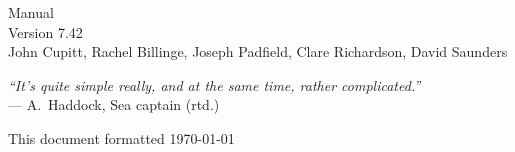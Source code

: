 \documentclass[a4paper,twocolumn,dvips]{book}
\begin{document}

\begin{titlepage}
\thispagestyle{empty}
\begin{center}
\huge
\nip{} Manual\\[0.2em]
\large Version 7.42\\
\vspace{0.5in}
\large
John Cupitt, 
Rachel Billinge,
Joseph Padfield, 
Clare Richardson, 
David Saunders\\ 
\end{center}

\vspace{3in}

\begin{center}
\noindent
\emph{``It's quite simple really, and at the same time, rather 
complicated.''} \\
--- A.\ Haddock, Sea captain (rtd.)
\end{center}

\vspace{3in}

\noindent
\small{This document formatted \today}
\setcounter{page}{1}
\end{titlepage}

\tableofcontents
\thispagestyle{plain}

\listoffigures
\thispagestyle{plain}

\listoftables
\thispagestyle{plain}

\blankpage
{}
\thispagestyle{plain}
\cfoot{}







\appendix

\end{document}
